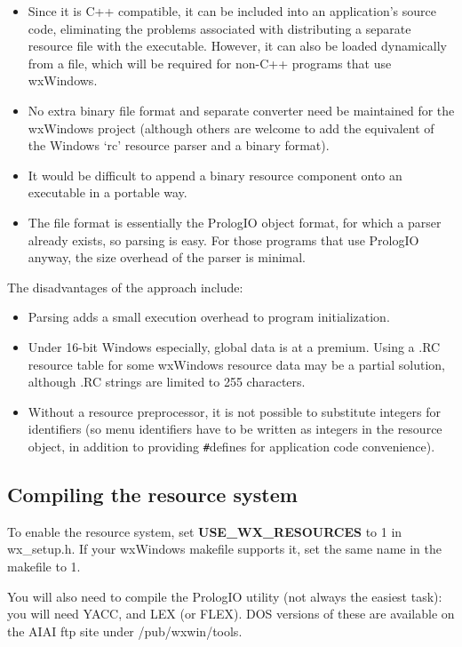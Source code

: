 \begin{itemize}\itemsep=0pt
\item Since it is C++ compatible, it can be included into an application's source code,
eliminating the problems associated with distributing a separate resource file
with the executable. However, it can also be loaded dynamically from a file, which will be required
for non-C++ programs that use wxWindows.
\item No extra binary file format and separate converter need be maintained for the wxWindows project
(although others are welcome to add the equivalent of the Windows `rc' resource
parser and a binary format).
\item It would be difficult to append a binary resource component onto an executable
in a portable way.
\item The file format is essentially the PrologIO object format, for which
a parser already exists, so parsing is easy. For those programs that use PrologIO
anyway, the size overhead of the parser is minimal.
\end{itemize}

The disadvantages of the approach include:

\begin{itemize}\itemsep=0pt
\item Parsing adds a small execution overhead to program initialization.
\item Under 16-bit Windows especially, global data is at a premium.
Using a .RC resource table for some wxWindows resource data may be a partial solution,
although .RC strings are limited to 255 characters.
\item Without a resource preprocessor, it is not possible to substitute integers
for identifiers (so menu identifiers have to be written as integers in the resource
object, in addition to providing \verb$#$defines for application code convenience).
\end{itemize}

\subsection{Compiling the resource system}

To enable the resource system, set {\bf USE\_WX\_RESOURCES} to 1 in wx\_setup.h.
If your wxWindows makefile supports it, set the same name in the makefile to 1.

You will also need to compile the PrologIO utility (not always the easiest
task): you will need YACC, and LEX (or FLEX). DOS versions of these are
available on the AIAI ftp site under /pub/wxwin/tools.

